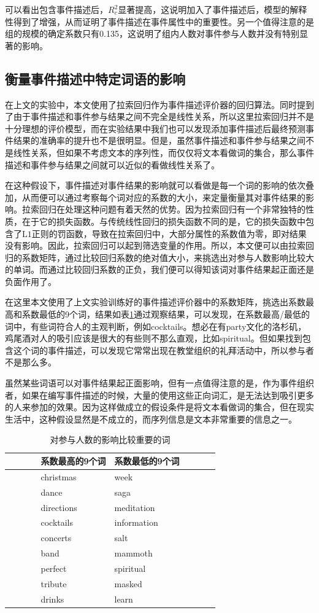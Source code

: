 可以看出包含事件描述后，\(R_c^2\)显著提高，这说明加入了事件描述后，模型的解释性得到了增强，从而证明了事件描述在事件属性中的重要性。另一个值得注意的是组的规模的确定系数只有0.135，这说明了组内人数对事件参与人数并没有特别显著的影响。

\subsection{衡量事件描述中特定词语的影响}
在上文的实验中，本文使用了拉索回归作为事件描述评价器的回归算法。同时提到了由于事件描述和事件参与结果之间不完全是线性关系，所以这里拉索回归并不是十分理想的评价模型，而在实验结果中我们也可以发现添加事件描述后最终预测事件结果的准确率的提升也不是很明显。但是，虽然事件描述和事件参与结果之间不是线性关系，但如果不考虑文本的序列性，而仅仅将文本看做词的集合，那么事件描述和事件参与结果之间就可以近似的看做线性关系了。

在这种假设下，事件描述对事件结果的影响就可以看做是每一个词的影响的依次叠加，从而便可以通过考察每个词对应的系数的大小，来定量衡量其对事件结果的影响。拉索回归在处理这种问题有着天然的优势。因为拉索回归有一个非常独特的性质，在于它的损失函数。与传统线性回归的损失函数不同的是，它的损失函数中包含了$\mathrm{L1}$正则的罚函数，导致在拉索回归中，大部分属性的系数值为零，即对结果没有影响。因此，拉索回归可以起到筛选变量的作用\citep{tibshirani_regression_1996}。所以，本文便可以由拉索回归的系数矩阵，通过比较回归系数的绝对值大小，来挑选出对参与人数影响比较大的单词。而通过比较回归系数的正负，我们便可以得知该词对事件结果起正面还是负面作用了\citep{noauthor_predicting_nodate}。

在这里本文使用了上文实验训练好的事件描述评价器中的系数矩阵，挑选出系数最高和系数最低的9个词，结果如表\ref{t1-2}通过观察结果，可以发现，在系数最高/最低的词中，有些词符合人的主观判断，例如cocktails。想必在有party文化的洛杉矶，鸡尾酒对人的吸引应该是很大的有些则不那么直观，比如spiritual。但如果找到包含这个词的事件描述，可以发现它常常出现在教堂组织的礼拜活动中，所以参与者不是那么多。

虽然某些词语可以对事件结果起正面影响，但有一点值得注意的是，作为事件组织者，如果在编写事件描述的时候，大量的使用这些正向词汇，是无法达到吸引更多的人来参加的效果。因为这样做成立的假设条件是将文本看做词的集合，但在现实生活中，这种假设显然是不成立的，而序列信息是文本非常重要的信息之一。

\begin{table}[htbp]
  \caption{\label{t1-2}对参与人数的影响比较重要的词}
    \centering
      \begin{tabular*}{\linewidth}{p{0.15\linewidth}p{0.35\linewidth}p{0.35\linewidth}p{0.15\linewidth}}
  \toprule      
      &系数最高的9个词 & 系数最低的9个词&\tabularnewline
  \midrule
  &christmas & week&\tabularnewline
  &dance & saga&\tabularnewline
  &directions & meditation&\tabularnewline
  &cocktails & information&\tabularnewline
  &concerts & salt&\tabularnewline
  &band & mammoth&\tabularnewline
  &perfect & spiritual&\tabularnewline
  &tribute & masked&\tabularnewline
  &drinks & learn&\tabularnewline
  \bottomrule
      \end{tabular*}
  \end{table}


